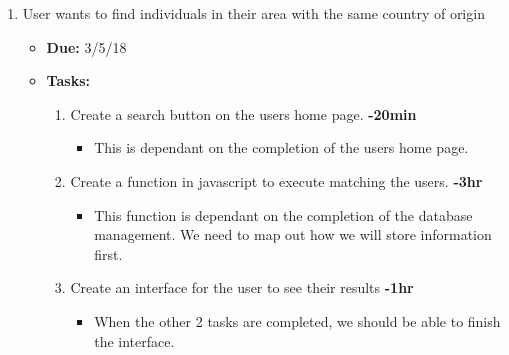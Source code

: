 \documentclass[12pt]{article}
\begin{document}
\begin{enumerate}
    \item User wants to find individuals in their area with the same country of origin
      \begin{itemize}
        \item \textbf{Due:} 3/5/18
        \item \textbf{Tasks:}
          \begin{enumerate}
            \item Create a search button on the users home page. \textbf{-20min}
              \begin{itemize}
                \item This is dependant on the completion of the users home page.
              \end{itemize}
            \item Create a function in javascript to execute matching the users. \textbf{-3hr}
              \begin{itemize}
                \item This function is dependant on the completion of the database management. We need to map out how we will store information first.
              \end{itemize}
            \item Create an interface for the user to see their results \textbf{-1hr}
              \begin{itemize}
                \item When the other 2 tasks are completed, we should be able to finish the interface.
              \end{itemize}
          \end{enumerate}
      \end{itemize}


\end{enumerate}
\end{document}
